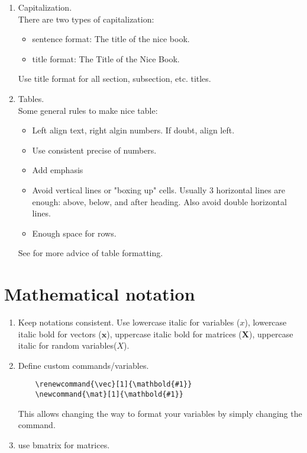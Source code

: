 \documentclass{article}
\begin{document}
\begin{enumerate}
   \item Capitalization.\\
   There are two types of capitalization:
   \begin{itemize}
       \item sentence format: The title of the nice book.
       \item title format: The Title of the Nice Book.
   \end{itemize}
   Use title format for all section, subsection, etc. titles.
   
   \item Tables.\\
   Some general rules to make nice table:
   \begin{itemize}
       \item Left align text, right algin numbers. If doubt, align left. 
       \item Use consistent precise of numbers. 
       \item Add emphasis 
       \item Avoid vertical lines or "boxing up" cells. Usually 3 horizontal lines are
enough: above, below, and after heading. Also avoid double horizontal lines.
        \item Enough space for rows.
   \end{itemize}
   See \cite{GuideTables} for more advice of table formatting. 
\end{enumerate}

\section{Mathematical notation}
\begin{enumerate}
    \item Keep notations consistent. Use lowercase italic for variables ($x$), lowercase italic bold for vectors ($\mathbold{x}$), uppercase italic bold for matrices ($\mathbold{X}$), uppercase italic for random variables($X$).
    \item Define custom commands/variables.
    \begin{lstlisting}
    \renewcommand{\vec}[1]{\mathbold{#1}}
    \newcommand{\mat}[1]{\mathbold{#1}}
    \end{lstlisting}
    This allows changing the way to format your variables by simply changing the command. 
        
    
    \item use bmatrix for matrices.
\end{enumerate}{}
\end{document}
